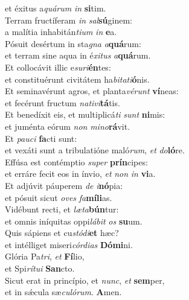 \oddverse et éxitus a\textit{quá}\textit{rum} \textit{in} \textbf{si}tim.\\
\evenverse Terram fructíferam \textit{in} \textit{sal}\textbf{sú}ginem:~\*\\
\evenverse a malítia inhabitán\textit{ti}\textit{um} \textit{in} \textbf{e}a.\\
\oddverse Pósuit desértum in sta\textit{gna} \textit{a}\textbf{quá}rum:~\*\\
\oddverse et terram sine aqua in é\textit{xi}\textit{tus} \textit{a}\textbf{quá}rum.\\
\evenverse Et collocávit illic e\textit{su}\textit{ri}\textbf{én}tes:~\*\\
\evenverse et constituérunt civitátem ha\textit{bi}\textit{ta}\textit{ti}\textbf{ó}nis.\\
\oddverse Et seminavérunt agros, et planta\textit{vé}\textit{runt} \textbf{ví}neas:~\*\\
\oddverse et fecérunt fructum \textit{na}\textit{ti}\textit{vi}\textbf{tá}tis.\\
\evenverse Et benedíxit eis, et multiplicá\textit{ti} \textit{sunt} \textbf{ni}mis:~\*\\
\evenverse et juménta eórum \textit{non} \textit{mi}\textit{no}\textbf{rá}vit.\\
\oddverse Et \textit{pau}\textit{ci} \textbf{fa}cti sunt:~\*\\
\oddverse et vexáti sunt a tribulatióne maló\textit{rum}, \textit{et} \textit{do}\textbf{ló}re.\\
\evenverse Effúsa est contémptio \textit{su}\textit{per} \textbf{prín}cipes:~\*\\
\evenverse et erráre fecit eos in ínvio, \textit{et} \textit{non} \textit{in} \textbf{vi}a.\\
\oddverse Et adjúvit páuperem \textit{de} \textit{i}\textbf{nó}pia:~\*\\
\oddverse et pósuit sicut \textit{o}\textit{ves} \textit{fa}\textbf{mí}\textbf{li}as.\\
\evenverse Vidébunt recti, et \textit{læ}\textit{ta}\textbf{bún}tur:~\*\\
\evenverse et omnis iníquitas oppi\textit{lá}\textit{bit} \textit{os} \textbf{su}um.\\
\oddverse Quis sápiens et cu\textit{stó}\textit{di}\textbf{et} hæc?~\*\\
\oddverse et intélliget miseri\textit{cór}\textit{di}\textit{as} \textbf{Dó}\textbf{mi}ni.\\
\evenverse Glória Pa\textit{tri}, \textit{et} \textbf{Fí}lio,~\*\\
\evenverse et Spi\textit{rí}\textit{tu}\textit{i} \textbf{San}cto.\\
\oddverse Sicut erat in princípio, et \textit{nunc}, \textit{et} \textbf{sem}per,~\*\\
\oddverse et in sǽcula sæ\textit{cu}\textit{ló}\textit{rum}. \textbf{A}men.\\
